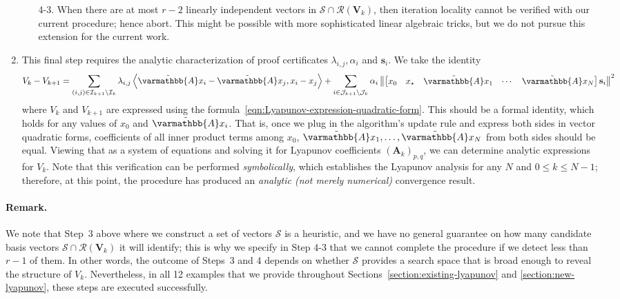 \documentclass{article}
\theoremstyle{definition}
\theoremstyle{plain}
\newcommand{\vs}{{\mathbf{s}}}
\newcommand{\vA}{{\mathbf{A}}}
\newcommand{\vV}{{\mathbf{V}}}
\newcommand{\cI}{{\mathcal{I}}}
\newcommand{\cJ}{{\mathcal{J}}}
\newcommand{\cR}{{\mathcal{R}}}
\newcommand{\cS}{{\mathcal{S}}}
\newcommand{\opA}{{\varmathbb{A}}}
\newcommand{\inprod}[2]{\left\langle #1,#2 \right\rangle}
\newcommand{\sqnorm}[1]{\left\| #1 \right\|^2}
\newcommand{\topa}{\tilde{\opA}}
\begin{document}
\begin{enumerate}
\begin{itemize}
        \item[4-3.] When there are at most $r-2$ linearly independent vectors in $\cS \cap \cR(\vV_k)$, 
        then iteration locality cannot be verified with our current procedure; hence abort. 
        This might be possible with more sophisticated linear algebraic tricks, but we do not pursue this extension for the current work.
    \end{itemize} 
    
    \item This final step requires the analytic characterization of proof certificates $\lambda_{i,j}, \alpha_i$ and $\vs_i$.
    We take the identity
    \begin{align*}
        V_k - V_{k+1} = \sum_{(i,j) \in \cI_{k+1}\setminus \cI_k} \lambda_{i,j} \inprod{\topa x_i - \topa x_j}{x_i - x_j}  
        + \sum_{i\in \cJ_{k+1} \setminus \cJ_k} \alpha_i \sqnorm{\begin{bmatrix} x_0 & x_\star & \topa x_1 & \cdots & \topa x_N \end{bmatrix} \vs_i}
    \end{align*}
    where $V_k$ and $V_{k+1}$ are expressed using the formula~\eqref{eqn:Lyapunov-expression-quadratic-form}.
    This should be a formal identity, which holds for any values of $x_0$ and $\topa x_i$.
    That is, once we plug in the algorithm's update rule and express both sides in vector quadratic forms, coefficients of all inner product terms among $x_0$, $\topa x_1, \dots, \topa x_N$ from both sides should be equal.
    Viewing that as a system of equations and solving it for Lyapunov coefficients $(\vA_k)_{p,q}$, we can determine analytic expressions for $V_k$.
    Note that this verification can be performed \emph{symbolically}, which establishes the Lyapunov analysis for any $N$ and $0\le k\le N-1$;
    therefore, at this point, the procedure has produced an \emph{analytic (not merely numerical)} convergence result.
\end{enumerate}

\paragraph{Remark.} 
We note that Step~3 above where we construct a set of vectors $\cS$ is a heuristic, and we have no general guarantee on how many candidate basis vectors $\cS \cap \cR(\vV_k)$ it will identify;
this is why we specify in Step 4-3 that we cannot complete the procedure if we detect less than $r-1$ of them.
In other words, the outcome of Steps~3 and 4 depends on whether $\cS$ provides a search space that is broad enough to reveal the structure of $V_k$.
Nevertheless, in all 12 examples that we provide throughout Sections~\ref{section:existing-lyapunov} and \ref{section:new-lyapunov}, these steps are executed successfully.
\end{document}

